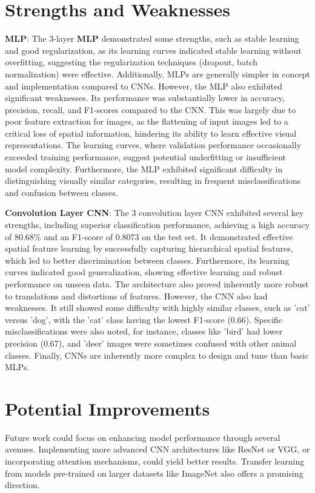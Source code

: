 \documentclass[12pt, a4paper]{report}
\begin{document}
\section{Strengths and Weaknesses}
\textbf{MLP}: The 3-layer \textbf{MLP} demonstrated some strengths, such as stable learning and good regularization, as its learning curves indicated stable learning without overfitting, suggesting the regularization techniques (dropout, batch normalization) were effective.
    Additionally, MLPs are generally simpler in concept and implementation compared to CNNs. However, the MLP also exhibited significant weaknesses.
    Its performance was substantially lower in accuracy, precision, recall, and F1-scores compared to the CNN.
    This was largely due to poor feature extraction for images, as the flattening of input images led to a critical loss of spatial information, hindering its ability to learn effective visual representations.
    The learning curves, where validation performance occasionally exceeded training performance, suggest potential underfitting or insufficient model complexity.
    Furthermore, the MLP exhibited significant difficulty in distinguishing visually similar categories, resulting in frequent misclassifications and confusion between classes.

\textbf{Convolution Layer CNN}: The 3 convolution layer CNN exhibited several key strengths, including superior classification performance, achieving a high accuracy of 80.68\% and an F1-score of 0.8073 on the test set.
    It demonstrated effective spatial feature learning by successfully capturing hierarchical spatial features, which led to better discrimination between classes.
    Furthermore, its learning curves indicated good generalization, showing effective learning and robust performance on unseen data.
    The architecture also proved inherently more robust to translations and distortions of features. However, the CNN also had weaknesses.
    It still showed some difficulty with highly similar classes, such as 'cat' versus 'dog', with the 'cat' class having the lowest F1-score (0.66).
    Specific misclassifications were also noted, for instance, classes like 'bird' had lower precision (0.67), and 'deer' images were sometimes confused with other animal classes.
    Finally, CNNs are inherently more complex to design and tune than basic MLPs.

\section{Potential Improvements}
Future work could focus on enhancing model performance through several avenues.
Implementing more advanced CNN architectures like ResNet or VGG, or incorporating attention mechanisms, could yield better results.
Transfer learning from models pre-trained on larger datasets like ImageNet also offers a promising direction.
\end{document}
